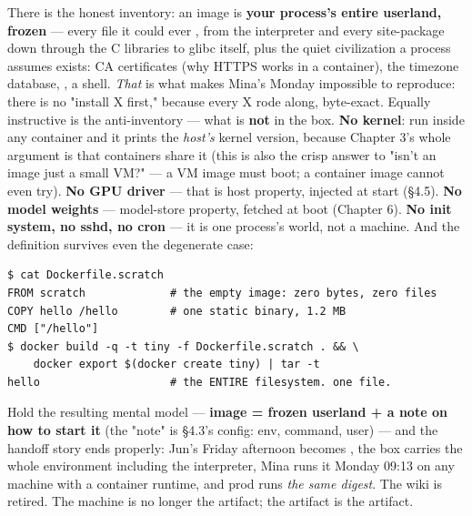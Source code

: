 There is the honest inventory: an image is \textbf{your process's entire userland, frozen} — every file it could ever , from the interpreter and every site-package down through the C libraries to glibc itself, plus the quiet civilization a process assumes exists: CA certificates (why HTTPS works in a container), the timezone database, , a shell. \textit{That} is what makes Mina's Monday impossible to reproduce: there is no "install X first," because every X rode along, byte-exact. Equally instructive is the anti-inventory — what is \textbf{not} in the box. \textbf{No kernel}: run  inside any container and it prints the \textit{host's} kernel version, because Chapter 3's whole argument is that containers share it (this is also the crisp answer to "isn't an image just a small VM?" — a VM image must boot; a container image cannot even try). \textbf{No GPU driver} — that is host property, injected at start (§4.5). \textbf{No model weights} — model-store property, fetched at boot (Chapter 6). \textbf{No init system, no sshd, no cron} — it is one process's world, not a machine. And the definition survives even the degenerate case:

\begin{terminalbox}
\begin{Verbatim}[breaklines=true,breakanywhere=true,fontsize=\small,formatcom=\color{tbbtermfg},codes=\tbbcodeactive]
$ cat Dockerfile.scratch
FROM scratch             # the empty image: zero bytes, zero files
COPY hello /hello        # one static binary, 1.2 MB
CMD ["/hello"]
$ docker build -q -t tiny -f Dockerfile.scratch . && \
    docker export $(docker create tiny) | tar -t
hello                    # the ENTIRE filesystem. one file.
\end{Verbatim}
\end{terminalbox}

Hold the resulting mental model — \textbf{image = frozen userland + a note on how to start it} (the "note" is §4.3's config: env, command, user) — and the handoff story ends properly: Jun's Friday afternoon becomes , the box carries the whole environment including the interpreter, Mina runs it Monday 09:13 on any machine with a container runtime, and prod runs \textit{the same digest}. The wiki is retired. The machine is no longer the artifact; the artifact is the artifact.

